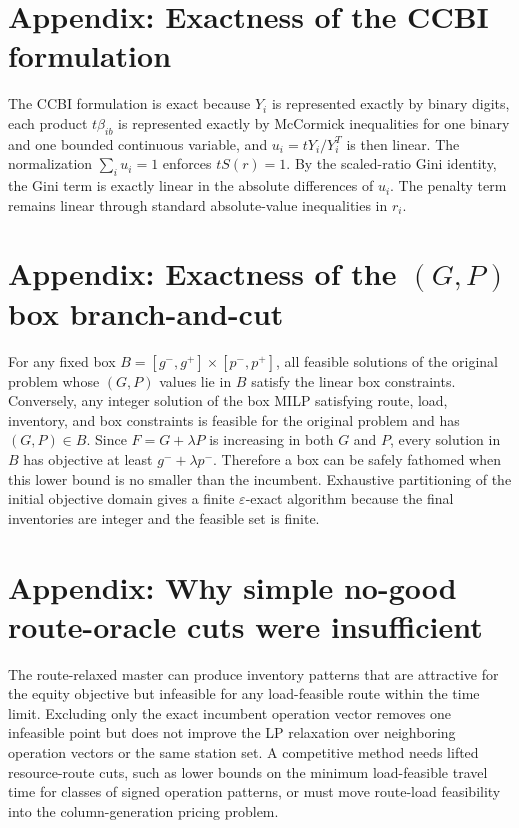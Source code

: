 \documentclass[11pt]{article}
\begin{document}
\section{Appendix: Exactness of the CCBI formulation}

The CCBI formulation is exact because $Y_i$ is represented exactly by binary digits, each product $t\beta_{ib}$ is represented exactly by McCormick inequalities for one binary and one bounded continuous variable, and $u_i=tY_i/Y_i^T$ is then linear.  The normalization $\sum_i u_i=1$ enforces $tS(r)=1$.  By the scaled-ratio Gini identity, the Gini term is exactly linear in the absolute differences of $u_i$.  The penalty term remains linear through standard absolute-value inequalities in $r_i$.

\section{Appendix: Exactness of the $(G,P)$ box branch-and-cut}

For any fixed box $B=[g^-,g^+]\times[p^-,p^+]$, all feasible solutions of the original problem whose $(G,P)$ values lie in $B$ satisfy the linear box constraints.  Conversely, any integer solution of the box MILP satisfying route, load, inventory, and box constraints is feasible for the original problem and has $(G,P)\in B$.  Since $F=G+\lambda P$ is increasing in both $G$ and $P$, every solution in $B$ has objective at least $g^-+\lambda p^-$.  Therefore a box can be safely fathomed when this lower bound is no smaller than the incumbent.  Exhaustive partitioning of the initial objective domain gives a finite $\varepsilon$-exact algorithm because the final inventories are integer and the feasible set is finite.

\section{Appendix: Why simple no-good route-oracle cuts were insufficient}

The route-relaxed master can produce inventory patterns that are attractive for the equity objective but infeasible for any load-feasible route within the time limit.  Excluding only the exact incumbent operation vector removes one infeasible point but does not improve the LP relaxation over neighboring operation vectors or the same station set.  A competitive method needs lifted resource-route cuts, such as lower bounds on the minimum load-feasible travel time for classes of signed operation patterns, or must move route-load feasibility into the column-generation pricing problem.
\end{document}
